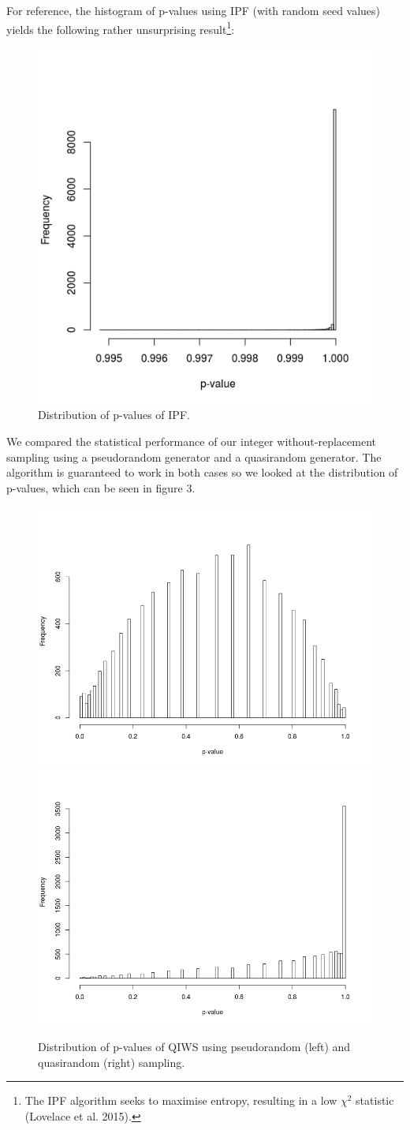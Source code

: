 \documentclass{JASSS}
\begin{document}
For reference, the histogram of p-values using IPF (with random seed
values) yields the following rather unsurprising result\footnote{The IPF algorithm
 seeks to maximise entropy, resulting in a low \(\chi^2\) statistic (Lovelace et al. 2015).}:


\begin{figure}[!t]
\centering
\includegraphics[width=0.5\linewidth]{figures/ipf_pvalue_dist}
\caption{Distribution of p-values of IPF.}
\label{fig2}
\end{figure}


We compared the statistical performance of our integer without-replacement sampling using a pseudorandom
generator and a quasirandom generator. The algorithm is guaranteed to
work in both cases so we looked at the distribution of p-values, which
can be seen in figure 3.

\begin{figure}[!t]
\centering
\includegraphics[width=0.498\linewidth]{figures/iqws_prng_pvalue_dist} 
\includegraphics[width=0.498\linewidth]{figures/iqws_pvalue_dist} 
\caption{Distribution of p-values of QIWS using pseudorandom (left) and quasirandom (right) sampling.}
\label{fig:unnamed-chunk-4}
\end{figure}
\end{document}

